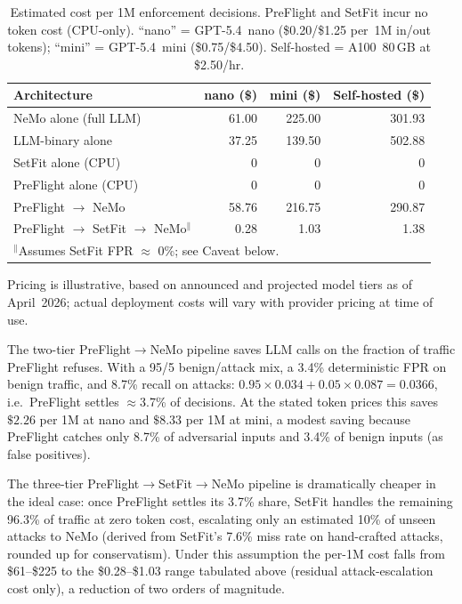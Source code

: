 \documentclass[11pt,a4paper]{article}
\begin{document}
\begin{table}[ht]
\centering
\caption{Estimated cost per 1M enforcement decisions. PreFlight and SetFit incur
  no token cost (CPU-only). ``nano'' = GPT-5.4~nano (\$0.20/\$1.25 per~1M
  in/out tokens); ``mini'' = GPT-5.4~mini (\$0.75/\$4.50). Self-hosted =
  A100~80\,GB at \$2.50/hr.}
\label{tab:cost}
\small
\begin{tabular}{lrrr}
\toprule
\textbf{Architecture} & \textbf{nano (\$)} & \textbf{mini (\$)} & \textbf{Self-hosted (\$)} \\
\midrule
NeMo alone (full LLM)          & 61.00 & 225.00 & 301.93 \\
LLM-binary alone                & 37.25 & 139.50 & 502.88 \\
SetFit alone (CPU)              & 0     & 0      & 0 \\
PreFlight alone (CPU)               & 0     & 0      & 0 \\
PreFlight $\to$ NeMo               & 58.76 & 216.75 & 290.87 \\
PreFlight $\to$ SetFit $\to$ NeMo$^\|$  & 0.28  & 1.03   & 1.38 \\
\bottomrule
\multicolumn{4}{l}{\footnotesize $^\|$Assumes SetFit FPR $\approx$ 0\%; see Caveat below.} \\
\end{tabular}
\vspace{2pt}
\footnotesize Pricing is illustrative, based on announced and projected model tiers
as of April~2026; actual deployment costs will vary with provider pricing
at time of use.
\end{table}

The two-tier PreFlight$\to$NeMo pipeline saves LLM calls on the
fraction of traffic PreFlight refuses. With a 95/5 benign/attack
mix, a 3.4\% deterministic FPR on benign traffic, and 8.7\% recall
on attacks:
$0.95 \times 0.034 + 0.05 \times 0.087 = 0.0366$, i.e.\ PreFlight
settles $\approx$3.7\% of decisions. At the stated token prices this
saves $\$2.26$ per 1M at nano and $\$8.33$ per 1M at mini, a modest
saving because PreFlight catches only 8.7\% of adversarial inputs and
3.4\% of benign inputs (as false positives).

The three-tier PreFlight$\to$SetFit$\to$NeMo pipeline is dramatically
cheaper in the ideal case: once PreFlight settles its 3.7\% share,
SetFit handles the remaining 96.3\% of traffic at zero token cost,
escalating only an estimated 10\% of unseen attacks to NeMo
(derived from SetFit's 7.6\% miss rate on hand-crafted attacks,
rounded up for conservatism).
Under this assumption the per-1M cost falls from \$61--\$225 to the
\$0.28--\$1.03 range tabulated above (residual attack-escalation
cost only), a reduction of two orders of magnitude.
\end{document}
